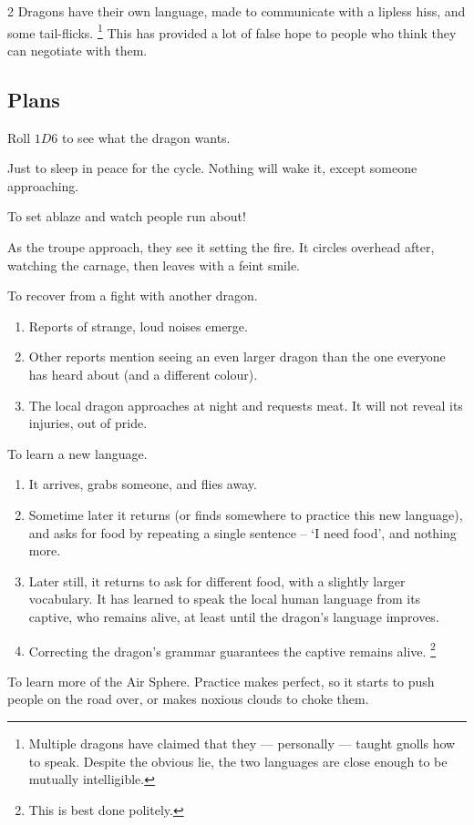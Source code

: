 \begin{multicols}{2}
Dragons have their own language, made to communicate with a lipless hiss, and some tail-flicks.%
\footnote{Multiple dragons have claimed that they --- personally --- taught gnolls how to speak.
Despite the obvious lie, the two languages are close enough to be mutually intelligible.}
This has provided a lot of false hope to people who think they can negotiate with them.

\dragon

\showStdSpells

\subsection{Plans}

Roll $1D6$ to see what the dragon wants.

\begin{dlist}
  \item
  Just to sleep in peace for the \gls{cycle}.
  Nothing will wake it, except someone approaching.
  \item
  To set  ablaze and watch people run about!

  As the troupe approach, they see it setting the fire.
  It circles overhead after, watching the carnage, then leaves with a feint smile.
  \item
  To recover from a fight with another dragon.
  \begin{enumerate}
    \item
    Reports of strange, loud noises emerge.
    \item
    Other reports mention seeing an even larger dragon than the one everyone has heard about (and a different colour).
    \item
    The local dragon approaches  at night and requests meat.
    It will not reveal its injuries, out of pride.
  \end{enumerate}
  \item
  To learn a new language.
  \begin{enumerate}
    \item
    It arrives, grabs someone, and flies away.
    \item
    Sometime later it returns (or finds somewhere to practice this new language), and asks for food by repeating a single sentence -- `I need food', and nothing more.
    \item
    Later still, it returns to ask for different food, with a slightly larger vocabulary.
    It has learned to speak the local human language from its captive, who remains alive, at least until the dragon's language improves.
    \item
    Correcting the dragon's grammar guarantees the captive remains alive.%
    \footnote{This is best done politely.}
  \end{enumerate}
  \item
  To learn more of the Air Sphere.
  Practice makes perfect, so it starts to push people on the road over, or makes noxious clouds to choke them.


\end{dlist}
\end{multicols}
